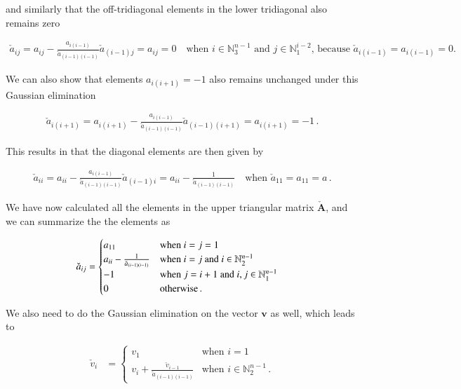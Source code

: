 \documentclass[11pt,english,a4paper]{article}
\begin{document}
\begin{flushleft}
and similarly that the off-tridiagonal elements in the lower tridiagonal also remains zero

\begin{align*}
\check{a}_{ij} = a_{ij} - \frac{a_{i(i-1)}}{\check{a}_{(i-1)(i-1)}} \check{a}_{(i-1)j} = a_{ij} = 0 \quad \text{when $i\in\mathbb{N}_3^{n-1}$ and $j\in\mathbb{N}_{1}^{i-2}$, because $\check{a}_{i(i-1)}=a_{i(i-1)} = 0$.}
\end{align*}

We can also show that elements $a_{i(i+1)}=-1$ also remains unchanged under this Gaussian elimination

\begin{align*}
\check{a}_{i(i+1)} = a_{i(i+1)} - \frac{a_{i(i-1)}}{\check{a}_{(i-1)(i-1)}} \check{a}_{(i-1)(i+1)} = a_{i(i+1)} = -1 \,.
\end{align*}

This results in that the diagonal elements are then given by

\begin{align}
\check{a}_{ii} = a_{ii} - \frac{a_{i(i-1)}}{\check{a}_{(i-1)(i-1)}} \check{a}_{(i-1)i} = a_{ii} - \frac{1}{\check{a}_{(i-1)(i-1)}} \quad \text{when }\check{a}_{11} = a_{11} = a\,.
\label{eq_19}
\end{align} 

We have now calculated all the elements in the upper triangular matrix $\check{\textbf{A}}$, and we can summarize the the elements as

\begin{align*}
\check{a}_{ij} &= \begin{cases} a_{11} & \text{when $i=j=1$} \\ a_{ii} - \frac{1}{\check{a}_{(i-1)(i-1)}} & \text{when $i=j$ and  $i\in\mathbb{N}_2^{n-1}$} \\ -1 & \text{when $j=i+1$ and $i,j\in\mathbb{N}_1^{n-1}$} \\ 0 & \text{otherwise\,.}\end{cases}
\end{align*}

We also need to do the Gaussian elimination on the vector $\textbf{v}$ as well, which leads to

\begin{align}
\check{v}_i &= \begin{cases} v_1 & \text{when $i=1$} \\ v_i + \frac{\check{v}_{i-1}}{\check{a}_{(i-1)(i-1)}} & \text{when $i\in\mathbb{N}_2^{n-1}$}\,. \end{cases}
\label{eq_20}
\end{align}


\end{flushleft}
\end{document}
